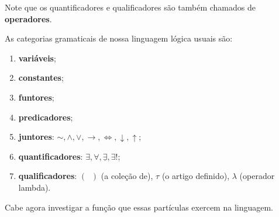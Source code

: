 Note que os quantificadores e qualificadores são também chamados de \textbf{operadores}.

As categorias gramaticais de nossa linguagem lógica usuais são:

\begin{enumerate}
    \item \textbf{variáveis};
    \item \textbf{constantes};
    \item \textbf{funtores};
    \item \textbf{predicadores};
    \item \textbf{juntores}: $\sim, \wedge, \vee, \to, \iff, \downarrow, \uparrow$;
    \item \textbf{quantificadores}: $\exists, \forall, \underline{\exists}, \exists!$;
    \item \textbf{qualificadores}: $(\;\;)$ (a coleção de), $\tau$ (o artigo definido), $\lambda$ (operador lambda).
\end{enumerate}

Cabe agora investigar a função que essas partículas exercem na linguagem.

